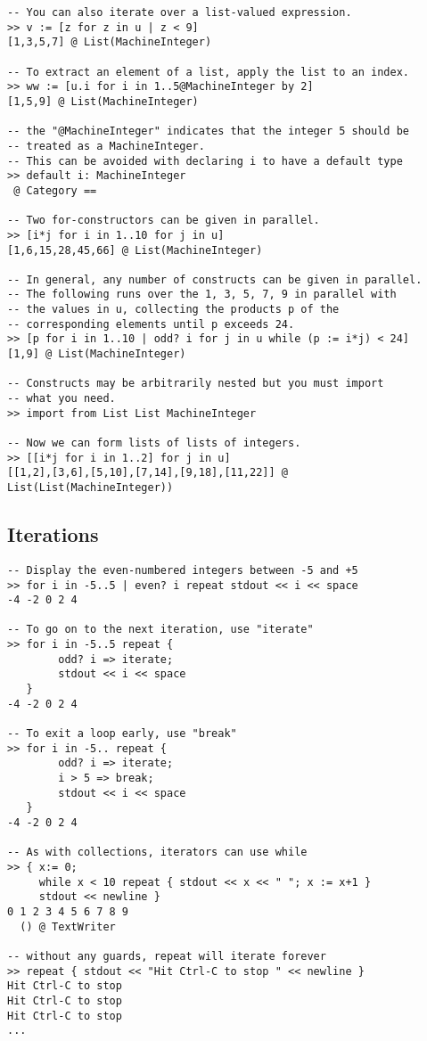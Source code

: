 \documentclass{article}
\begin{document}
\begin{small}
\begin{verbatim}
-- You can also iterate over a list-valued expression.
>> v := [z for z in u | z < 9]
[1,3,5,7] @ List(MachineInteger)

-- To extract an element of a list, apply the list to an index.
>> ww := [u.i for i in 1..5@MachineInteger by 2]
[1,5,9] @ List(MachineInteger)

-- the "@MachineInteger" indicates that the integer 5 should be 
-- treated as a MachineInteger.
-- This can be avoided with declaring i to have a default type
>> default i: MachineInteger
 @ Category == 

-- Two for-constructors can be given in parallel.
>> [i*j for i in 1..10 for j in u]
[1,6,15,28,45,66] @ List(MachineInteger)

-- In general, any number of constructs can be given in parallel.
-- The following runs over the 1, 3, 5, 7, 9 in parallel with
-- the values in u, collecting the products p of the
-- corresponding elements until p exceeds 24.
>> [p for i in 1..10 | odd? i for j in u while (p := i*j) < 24]
[1,9] @ List(MachineInteger)

-- Constructs may be arbitrarily nested but you must import
-- what you need.
>> import from List List MachineInteger

-- Now we can form lists of lists of integers.
>> [[i*j for i in 1..2] for j in u]
[[1,2],[3,6],[5,10],[7,14],[9,18],[11,22]] @ List(List(MachineInteger))
\end{verbatim}
\end{small}

\subsection{Iterations}

\begin{small}
\begin{verbatim}
-- Display the even-numbered integers between -5 and +5
>> for i in -5..5 | even? i repeat stdout << i << space
-4 -2 0 2 4

-- To go on to the next iteration, use "iterate"
>> for i in -5..5 repeat {
        odd? i => iterate;
        stdout << i << space
   }
-4 -2 0 2 4

-- To exit a loop early, use "break"
>> for i in -5.. repeat {
        odd? i => iterate;
        i > 5 => break;
        stdout << i << space
   }
-4 -2 0 2 4

-- As with collections, iterators can use while
>> { x:= 0;
     while x < 10 repeat { stdout << x << " "; x := x+1 }
     stdout << newline }
0 1 2 3 4 5 6 7 8 9 
  () @ TextWriter

-- without any guards, repeat will iterate forever
>> repeat { stdout << "Hit Ctrl-C to stop " << newline }
Hit Ctrl-C to stop
Hit Ctrl-C to stop
Hit Ctrl-C to stop
...
\end{verbatim}
\end{small}
\end{document}
